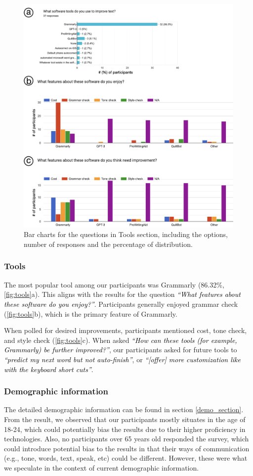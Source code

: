 \documentclass[acmsmall,screen,authorversion,nonacm]{acmart}
\newcommand{\QUOTE}[1]{\textsf{\textit{\textcolor{black}{``#1''}}}}
\begin{document}
\begin{figure}[h]
\begin{center}
\includegraphics[width=0.7\linewidth]{figures/tools.jpg}
\caption{Bar charts for the questions in Tools section, including the options, number of responses and the percentage of distribution.}
\label{fig:tools}
\Description{}
\end{center}
\end{figure}


\subsubsection{Tools}
The most popular tool among our participants was Grammarly (86.32\%, \autoref{fig:tools}a). This aligns with the results for the question \QUOTE{What features about these software do you enjoy?}. Participants generally enjoyed grammar check (\autoref{fig:tools}b), which is the primary feature of Grammarly. 

When polled for desired improvements, participants mentioned cost, tone check, and style check (\autoref{fig:tools}c). When asked \QUOTE{How can these tools (for example, Grammarly) be further improved?}, our participants asked for future tools to \QUOTE{predict my next word but not auto-finish}, or \QUOTE{[offer] more customization like with the keyboard short cuts}.

\subsubsection{Demographic information}
The detailed demographic information can be found in section \ref{demo_section}. From the result, we observed that our participants mostly situates in the age of 18-24, which could potentially bias the results due to their higher proficiency in technologies. Also, no participants over 65 years old responded the survey, which could introduce potential bias to the results in that their ways of communication (e.g., tone, words, text, speak, etc) could be different. However, these were what we speculate in the context of current demographic information. 
\end{document}
